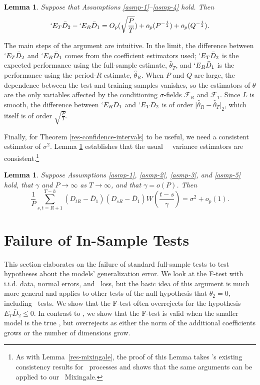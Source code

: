 \documentclass[11pt]{article}
\newtheorem{lem}[thm]{Lemma}
\newcommand{\E}{`E}
\newcommand{\citepos}[1]{\citeauthor{#1}'s \citeyearpar{#1}}
\newcommand{\oosSum}[2]{\ensuremath{\sum_{#1=R+#2}^{T-\h}}}
\newcommand{\h}{h}
\newcommand{\vWeight}{W(\frac{t-s}{\gamma})}
\begin{document}
\begin{lem} \label{res-convergence} Suppose that Assumptions
  \ref{asmp-1}--\ref{asmp-4} hold.  Then
\begin{equation*}
  \E_T \bar{D}_2 - \E_R \bar D_1 =  O_p(\sqrt{\frac PT}) +
  o_p(P^{-\frac12}) + o_p(Q^{-\frac12}).
\end{equation*}
\end{lem}

The main steps of the argument are intuitive.  In the limit, the
difference between $\E_T \bar{D}_2$ and $\E_R \bar D_1$ comes from the
coefficient estimators used; $\E_T\bar{D}_2$ is the expected
performance using the full-sample estimate, $\hat{\theta}_T$, and
$\E_R \bar D_1$ is the performance using the period-$R$ estimate,
$\hat{\theta}_R$.  When $P$ and $Q$ are large, the dependence between
the test and training samples vanishes, so the estimators of $\theta$
are the only variables affected by the conditioning $\sigma$-fields
$\mathcal{F}_R$ and $\mathcal{F}_T$.  Since $L$ is smooth, the
difference between $\E_R \bar D_1$ and $\E_T \bar D_2$ is of order
$\lvert \hat\theta_R - \hat\theta_T \rvert_2$, which itself is of
order $\sqrt{\frac{P}{T}}$.

Finally, for Theorem \ref{res-confidence-intervals} to be useful, we
need a consistent estimator of $\sigma^2$. Lemma
\ref{res-variance-estimator} establishes that the usual \oos\ \hac\
variance estimators are consistent.\footnote{As with
      Lemma~\ref{res-mixingale}, the proof of this Lemma takes
      \citepos{de_jong_consistency_2000} existing consistency results
      for \ned\ processes and shows that the same arguments can be
      applied to our \oos\ Mixingale.}

\begin{lem}
  \label{res-variance-estimator}  Suppose Assumptions \ref{asmp-1},
  \ref{asmp-2}, \ref{asmp-3}, and \ref{asmp-5} hold, that $\gamma$ and $P
  \to \infty$ as $T \to \infty$, and that $\gamma = o(P)$.  Then
  \begin{equation*}
    \frac1P \oosSum{s,t}{1} (D_{tR} - \bar D_1)(D_{sR} - \bar D_1)
    \vWeight = \sigma^2 + o_p(1).
  \end{equation*}
\end{lem}


\section{Failure of In-Sample Tests}\label{sec:insample}
This section elaborates on the failure of standard full-sample tests
to test hypotheses about the models' generalization error.  We look at
the F-test with i.i.d. data, normal errors, and \mse\ loss, but the
basic idea of this argument is much more general and applies to other
tests of the null hypothesis that $\theta_2 = 0$, including \oos\
tests.  We show that the F-test often overrejects for the hypothesis
$E_T \bar D_2 \leq 0$.  In contrast to \citet{hansen_in-sample_2009},
we show that the F-test is valid when the smaller model is the true
\dgp, but overrejects as either the norm of the additional
coefficients grows or the number of dimensions grow.
\end{document}
